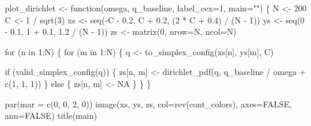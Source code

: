 \documentclass[
  letterpaper,
  DIV=11,
  numbers=noendperiod]{scrartcl}
\newenvironment{Shaded}{\begin{snugshade}}{\end{snugshade}}
\newcommand{\AttributeTok}[1]{\textcolor[rgb]{0.40,0.45,0.13}{#1}}
\newcommand{\ConstantTok}[1]{\textcolor[rgb]{0.56,0.35,0.01}{#1}}
\newcommand{\ControlFlowTok}[1]{\textcolor[rgb]{0.00,0.23,0.31}{#1}}
\newcommand{\DecValTok}[1]{\textcolor[rgb]{0.68,0.00,0.00}{#1}}
\newcommand{\FloatTok}[1]{\textcolor[rgb]{0.68,0.00,0.00}{#1}}
\newcommand{\FunctionTok}[1]{\textcolor[rgb]{0.28,0.35,0.67}{#1}}
\newcommand{\NormalTok}[1]{\textcolor[rgb]{0.00,0.23,0.31}{#1}}
\newcommand{\OtherTok}[1]{\textcolor[rgb]{0.00,0.23,0.31}{#1}}
\newcommand{\SpecialCharTok}[1]{\textcolor[rgb]{0.37,0.37,0.37}{#1}}
\newcommand{\StringTok}[1]{\textcolor[rgb]{0.13,0.47,0.30}{#1}}
\begin{document}
\begin{Shaded}
\begin{Highlighting}[]
\NormalTok{plot\_dirichlet }\OtherTok{\textless{}{-}} \ControlFlowTok{function}\NormalTok{(omega, q\_baseline, }\AttributeTok{label\_cex=}\DecValTok{1}\NormalTok{, }\AttributeTok{main=}\StringTok{""}\NormalTok{) \{}
\NormalTok{  N }\OtherTok{\textless{}{-}} \DecValTok{200}
\NormalTok{  C }\OtherTok{\textless{}{-}} \DecValTok{1} \SpecialCharTok{/} \FunctionTok{sqrt}\NormalTok{(}\DecValTok{3}\NormalTok{)}
\NormalTok{  xs }\OtherTok{\textless{}{-}} \FunctionTok{seq}\NormalTok{(}\SpecialCharTok{{-}}\NormalTok{C }\SpecialCharTok{{-}} \FloatTok{0.2}\NormalTok{, C }\SpecialCharTok{+} \FloatTok{0.2}\NormalTok{, (}\DecValTok{2} \SpecialCharTok{*}\NormalTok{ C }\SpecialCharTok{+} \FloatTok{0.4}\NormalTok{) }\SpecialCharTok{/}\NormalTok{ (N }\SpecialCharTok{{-}} \DecValTok{1}\NormalTok{))}
\NormalTok{  ys }\OtherTok{\textless{}{-}} \FunctionTok{seq}\NormalTok{(}\DecValTok{0} \SpecialCharTok{{-}} \FloatTok{0.1}\NormalTok{, }\DecValTok{1} \SpecialCharTok{+} \FloatTok{0.1}\NormalTok{, }\FloatTok{1.2} \SpecialCharTok{/}\NormalTok{ (N }\SpecialCharTok{{-}} \DecValTok{1}\NormalTok{))}
\NormalTok{  zs }\OtherTok{\textless{}{-}} \FunctionTok{matrix}\NormalTok{(}\DecValTok{0}\NormalTok{, }\AttributeTok{nrow=}\NormalTok{N, }\AttributeTok{ncol=}\NormalTok{N)}

  \ControlFlowTok{for}\NormalTok{ (n }\ControlFlowTok{in} \DecValTok{1}\SpecialCharTok{:}\NormalTok{N) \{}
    \ControlFlowTok{for}\NormalTok{ (m }\ControlFlowTok{in} \DecValTok{1}\SpecialCharTok{:}\NormalTok{N) \{}
\NormalTok{      q }\OtherTok{\textless{}{-}} \FunctionTok{to\_simplex\_config}\NormalTok{(xs[n], ys[m], C)}

      \ControlFlowTok{if}\NormalTok{ (}\FunctionTok{valid\_simplex\_config}\NormalTok{(q)) \{}
\NormalTok{        zs[n, m] }\OtherTok{\textless{}{-}} \FunctionTok{dirichlet\_pdf}\NormalTok{(q, q\_baseline }\SpecialCharTok{/}\NormalTok{ omega }\SpecialCharTok{+} \FunctionTok{c}\NormalTok{(}\DecValTok{1}\NormalTok{, }\DecValTok{1}\NormalTok{, }\DecValTok{1}\NormalTok{))}
\NormalTok{      \} }\ControlFlowTok{else}\NormalTok{ \{}
\NormalTok{        zs[n, m] }\OtherTok{\textless{}{-}} \ConstantTok{NA}
\NormalTok{      \}}
\NormalTok{    \}}
\NormalTok{  \}}

  \FunctionTok{par}\NormalTok{(}\AttributeTok{mar =} \FunctionTok{c}\NormalTok{(}\DecValTok{0}\NormalTok{, }\DecValTok{0}\NormalTok{, }\DecValTok{2}\NormalTok{, }\DecValTok{0}\NormalTok{))}
  \FunctionTok{image}\NormalTok{(xs, ys, zs, }\AttributeTok{col=}\FunctionTok{rev}\NormalTok{(cont\_colors), }\AttributeTok{axes=}\ConstantTok{FALSE}\NormalTok{, }\AttributeTok{ann=}\ConstantTok{FALSE}\NormalTok{)}
  \FunctionTok{title}\NormalTok{(main)}


\end{Highlighting}
\end{Shaded}
\end{document}
